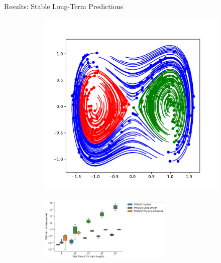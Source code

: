 \documentclass[8pt]{beamer}
\begin{document}
\begin{frame}{Results: Stable Long-Term Predictions}
\begin{figure}
	\begin{subfigure}[b]{0.3\textwidth}
		\includegraphics[width=\textwidth]{Figures/duff_full_train.pdf}
	\end{subfigure}%
	\begin{subfigure}[b]{0.7\textwidth}
		\centering
		\includegraphics[width=0.7\textwidth]{Figures/duffing_periods.pdf}
	\end{subfigure}
\end{figure}
\end{frame}
\end{document}

